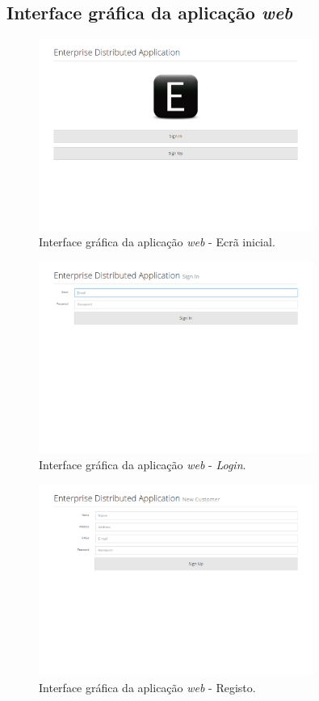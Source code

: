 \documentclass[12pt]{article}
\begin{document}
\subsection{Interface gráfica da aplicação \textit{web}}

\begin{figure}[H]
    \centering
    \includegraphics[width=0.8\textwidth]{Web_Initial.png}
    \caption{Interface gráfica da aplicação \textit{web} - Ecrã inicial.}
    \label{fig:c6}
\end{figure}

\begin{figure}[H]
    \centering
    \includegraphics[width=0.8\textwidth]{Web_Login.png}
    \caption{Interface gráfica da aplicação \textit{web} - \textit{Login}.}
    \label{fig:c7}
\end{figure}

\begin{figure}[H]
    \centering
    \includegraphics[width=0.8\textwidth]{Web_Register.png}
    \caption{Interface gráfica da aplicação \textit{web} - Registo.}
    \label{fig:c8}
\end{figure}
\end{document}
